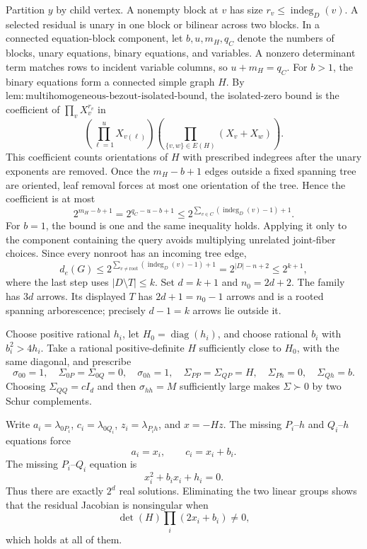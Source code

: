Partition \(y\) by child vertex. A nonempty block at \(v\) has size \(r_v\le\operatorname{indeg}_D(v)\). A selected residual is unary in one block or bilinear across two blocks. In a connected equation-block component, let \(b,u,m_H,q_C\) denote the numbers of blocks, unary equations, binary equations, and variables. A nonzero determinant term matches rows to incident variable columns, so \(u+m_H=q_C\). For \(b>1\), the binary equations form a connected simple graph \(H\). By \(\mathrm{lem:multihomogeneous\mbox{-}bezout\mbox{-}isolated\mbox{-}bound}\), the isolated-zero bound is the coefficient of \(\prod_vX_v^{r_v}\) in
\[
\left(\prod_{\ell=1}^{u}X_{v(\ell)}\right)
\left(\prod_{\{v,w\}\in E(H)}(X_v+X_w)\right).
\]
This coefficient counts orientations of \(H\) with prescribed indegrees after the unary exponents are removed. Once the \(m_H-b+1\) edges outside a fixed spanning tree are oriented, leaf removal forces at most one orientation of the tree. Hence the coefficient is at most
\[
2^{m_H-b+1}=2^{q_C-u-b+1}
\le2^{\sum_{v\in C}(\operatorname{indeg}_D(v)-1)+1}.
\]
For \(b=1\), the bound is one and the same inequality holds. Applying it only to the component containing the query avoids multiplying unrelated joint-fiber choices. Since every nonroot has an incoming tree edge,
\[
d_e(G)\le2^{\sum_{v\ne\mathrm{root}}(\operatorname{indeg}_D(v)-1)+1}
=2^{|D|-n+2}\le2^{k+1},
\]
where the last step uses \(|D\setminus T|\le k\).
Set \(d=k+1\) and \(n_0=2d+2\). The family has \(3d\) arrows. Its displayed \(T\) has \(2d+1=n_0-1\) arrows and is a rooted spanning arborescence; precisely \(d-1=k\) arrows lie outside it.

Choose positive rational \(h_i\), let \(H_0=\operatorname{diag}(h_i)\), and choose rational \(b_i\) with \(b_i^2>4h_i\). Take a rational positive-definite \(H\) sufficiently close to \(H_0\), with the same diagonal, and prescribe
\[
\sigma_{00}=1,\quad\Sigma_{0P}=\Sigma_{0Q}=0,\quad\sigma_{0h}=1,\quad
\Sigma_{PP}=\Sigma_{QP}=H,\quad\Sigma_{Ph}=0,\quad\Sigma_{Qh}=b.
\]
Choosing \(\Sigma_{QQ}=cI_d\) and then \(\sigma_{hh}=M\) sufficiently large makes \(\Sigma\succ0\) by two Schur complements.

Write \(a_i=\lambda_{0P_i}\), \(c_i=\lambda_{0Q_i}\), \(z_i=\lambda_{P_ih}\), and \(x=-Hz\). The missing \(P_i\)--\(h\) and \(Q_i\)--\(h\) equations force
\[
a_i=x_i,\qquad c_i=x_i+b_i.
\]
The missing \(P_i\)--\(Q_i\) equation is
\[
x_i^2+b_ix_i+h_i=0.
\]
Thus there are exactly \(2^d\) real solutions. Eliminating the two linear groups shows that the residual Jacobian is nonsingular when
\[
\det(H)\prod_i(2x_i+b_i)\ne0,
\]
which holds at all of them.

